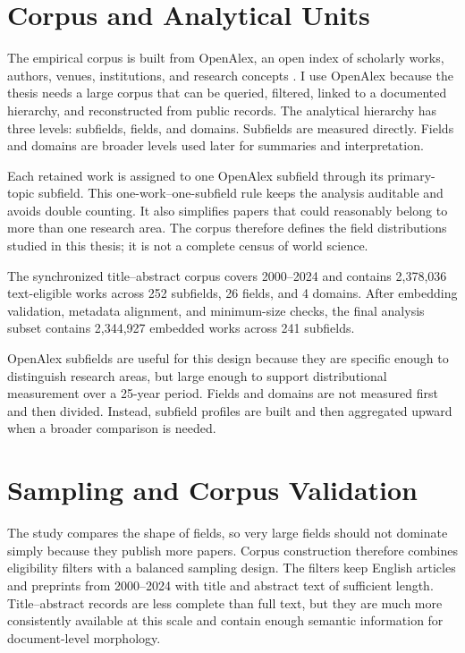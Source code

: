 
\section{Corpus and Analytical Units}

The empirical corpus is built from OpenAlex, an open index of scholarly works, authors, venues, institutions, and research concepts \parencite{priem2022openalex}. I use OpenAlex because the thesis needs a large corpus that can be queried, filtered, linked to a documented hierarchy, and reconstructed from public records. The analytical hierarchy has three levels: subfields, fields, and domains. Subfields are measured directly. Fields and domains are broader levels used later for summaries and interpretation.

Each retained work is assigned to one OpenAlex subfield through its primary-topic subfield. This one-work--one-subfield rule keeps the analysis auditable and avoids double counting. It also simplifies papers that could reasonably belong to more than one research area. The corpus therefore defines the field distributions studied in this thesis; it is not a complete census of world science.

The synchronized title–abstract corpus covers 2000–2024 and contains 2,378,036 text-eligible works across 252 subfields, 26 fields, and 4 domains. After embedding validation, metadata alignment, and minimum-size checks, the final analysis subset contains 2,344,927 embedded works across 241 subfields.



OpenAlex subfields are useful for this design because they are specific enough to distinguish research areas, but large enough to support distributional measurement over a 25-year period. Fields and domains are not measured first and then divided. Instead, subfield profiles are built and then aggregated upward when a broader comparison is needed.

\section{Sampling and Corpus Validation}

The study compares the shape of fields, so very large fields should not dominate simply because they publish more papers. Corpus construction therefore combines eligibility filters with a balanced sampling design. The filters keep English articles and preprints from 2000--2024 with title and abstract text of sufficient length. Title--abstract records are less complete than full text, but they are much more consistently available at this scale and contain enough semantic information for document-level morphology.

